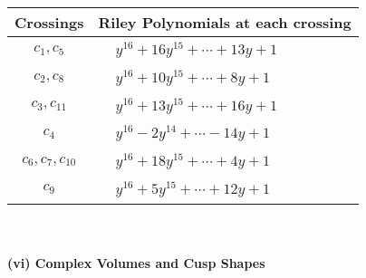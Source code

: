 \documentclass[1p]{elsarticle_modified}
\theoremstyle{definition}
\begin{document}
\begin{tabular}{m{50pt}|m{274pt}}
Crossings & \hspace{64pt}Riley Polynomials at each crossing \\
\hline $$\begin{aligned}c_{1},c_{5}\end{aligned}$$&$\begin{aligned}
&y^{16}+16 y^{15}+\cdots+13 y+1
\end{aligned}$\\
\hline $$\begin{aligned}c_{2},c_{8}\end{aligned}$$&$\begin{aligned}
&y^{16}+10 y^{15}+\cdots+8 y+1
\end{aligned}$\\
\hline $$\begin{aligned}c_{3},c_{11}\end{aligned}$$&$\begin{aligned}
&y^{16}+13 y^{15}+\cdots+16 y+1
\end{aligned}$\\
\hline $$\begin{aligned}c_{4}\end{aligned}$$&$\begin{aligned}
&y^{16}-2 y^{14}+\cdots-14 y+1
\end{aligned}$\\
\hline $$\begin{aligned}c_{6},c_{7},c_{10}\end{aligned}$$&$\begin{aligned}
&y^{16}+18 y^{15}+\cdots+4 y+1
\end{aligned}$\\
\hline $$\begin{aligned}c_{9}\end{aligned}$$&$\begin{aligned}
&y^{16}+5 y^{15}+\cdots+12 y+1
\end{aligned}$\\
\hline
\end{tabular}\\~\\
\newpage\flushleft \textbf{(vi) Complex Volumes and Cusp Shapes}
\end{document}
